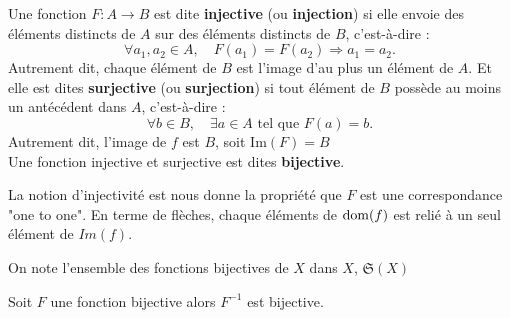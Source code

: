     

\begin{definition}
    Une fonction \( F : A \to B \) est dite \textbf{injective} (ou \textbf{injection}) si elle envoie des éléments distincts de \( A \) sur des éléments distincts de \( B \), c'est-à-dire :
\[
\forall a_1, a_2 \in A, \quad F(a_1) = F(a_2) \Rightarrow a_1 = a_2.
\]
Autrement dit, chaque élément de \( B \) est l'image d'au plus un élément de \( A \).
Et elle est dites \textbf{surjective} (ou \textbf{surjection}) si tout élément de \( B \) possède au moins un antécédent dans \( A \), c'est-à-dire :
\[
\forall b \in B, \quad \exists a \in A \text{ tel que } F(a) = b.
\]
Autrement dit, l'image de \( f \) est \( B \), soit \( \text{Im}(F) = B \)\\
Une fonction injective et surjective est dites \textbf{bijective}.

\end{definition}

La notion d'injectivité est nous donne la propriété que $F$ est une correspondance "one to one". En terme de flèches, chaque éléments de $\operatorname{dom}(f)$ est relié à un seul élément de $Im(f)$.

\begin{definition}
    On note l'ensemble des fonctions bijectives de $X$ dans $X$, $\mathfrak{S}(X)$
\end{definition}

\begin{proposition}
    Soit $F$ une fonction bijective alors $F^{-1}$ est bijective.
\end{proposition}

